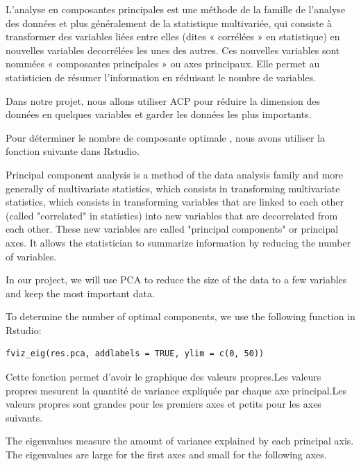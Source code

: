 \documentclass[12pt]{article}
\begin{document}
L'analyse en composantes principales est une méthode de la famille de l'analyse des données et plus généralement de la
statistique multivariée, qui consiste à transformer des variables liées entre elles (dites « corrélées » en statistique) en nouvelles variables decorrélées les unes des autres. Ces nouvelles variables sont nommées « composantes principales » ou axes principaux. Elle permet au statisticien de résumer l'information en réduisant le nombre de variables.

Dans notre projet, nous allons utiliser ACP pour réduire la dimension des données en quelques variables et garder les données les plus importants. 

Pour déterminer le nombre de composante optimale , nous avons utiliser la fonction suivante dans Rstudio.


Principal component analysis is a method of the data analysis family and more generally of multivariate statistics, which consists in transforming
multivariate statistics, which consists in transforming variables that are linked to each other (called "correlated" in statistics) into new variables that are decorrelated from each other. These new variables are called "principal components" or principal axes. It allows the statistician to summarize information by reducing the number of variables.

In our project, we will use PCA to reduce the size of the data to a few variables and keep the most important data. 

To determine the number of optimal components, we use the following function in Rstudio:

\begin{lstlisting}
fviz_eig(res.pca, addlabels = TRUE, ylim = c(0, 50))
\end{lstlisting} 

Cette fonction permet d'avoir le graphique des valeurs propres.Les valeurs propres mesurent la quantité de variance expliquée par chaque axe principal.Les valeurs propres sont grandes pour les premiers axes et petits pour les axes suivants.

The eigenvalues measure the amount of variance explained by each principal axis. The eigenvalues are large for the first axes and small for the following axes.


\newpage
\end{document}
